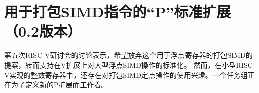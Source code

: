 \chapter{用于打包SIMD指令的“P”标准扩展（0.2版本）}
\label{sec:packedsimd}

\begin{commentary}
  第五次RISC-V研讨会的讨论表示，希望放弃这个用于浮点寄存器的打包SIMD的提案，转而支持在V扩展上对大型浮点SIMD操作的标准化。
  然而，在小型RISC-V实现的整数寄存器中，还存在对打包SIMD定点操作的使用兴趣。一个任务组正在为了定义新的P扩展而工作着。
\end{commentary}

